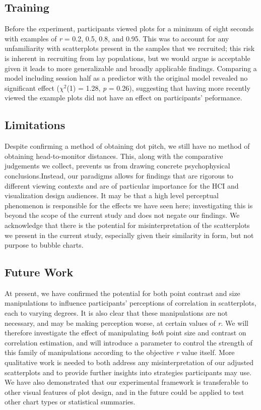\documentclass{vgtc}                          %
\begin{document}
\hypertarget{training}{%
\subsection{Training}\label{training}}

Before the experiment, participants viewed plots for a minimum of
eight seconds with examples of \emph{r} = 0.2, 0.5, 0.8, and 0.95. This was to account
for any unfamiliarity with scatterplots present in the samples
that we recruited; this risk is inherent in recruiting from lay populations, but we
would argue is acceptable given it leads to more generalizable and broadly
applicable findings. Comparing a model including session half as a predictor with the
original model revealed no significant effect (\(\chi^2\)(1)
= 1.28, \emph{p} = 0.26),
suggesting that having more recently viewed the example plots did not have an effect
on participants' peformance.

\hypertarget{limitations}{%
\subsection{Limitations}\label{limitations}}

Despite confirming a method of obtaining dot pitch, we still have no method of obtaining
head-to-monitor distances. This, along with the comparative judgements we collect, prevents us
from drawing concrete psychophysical conclusions.Instead, our paradigms allows
for findings that are rigorous to different viewing contexts and
are of particular importance for the HCI and visualization design audiences. It
may be that a high level perceptual phenomenon is responsible for the effects
we have seen here; investigating this is beyond the scope of the current study and
does not negate our findings. We acknowledge that there is the potential for misinterpretation
of the scatterplots we present in the current study, especially given their similarity in
form, but not purpose to bubble charts.

\hypertarget{future-work}{%
\subsection{Future Work}\label{future-work}}

At present, we have confirmed the potential for both point contrast and size
manipulations to influence participants' perceptions of correlation in scatterplots,
each to varying degrees. It is also clear that these manipulations are not necessary,
and may be making perception worse, at certain values of \emph{r}. We will therefore
investigate the effect of manipulating \emph{both} point size and contrast on correlation
estimation, and will introduce a parameter to control the strength of this
family of manipulations according to the objective \emph{r} value itself.
More qualitative work is needed to both address any misinterpretation
of our adjusted scatterplots and to provide further insights into strategies
participants may use. We have also demonstrated that our
experimental framework \cite{strain_2023} is transferable to other visual features
of plot design, and in the future could be applied to test other chart types or
statistical summaries.
\end{document}
